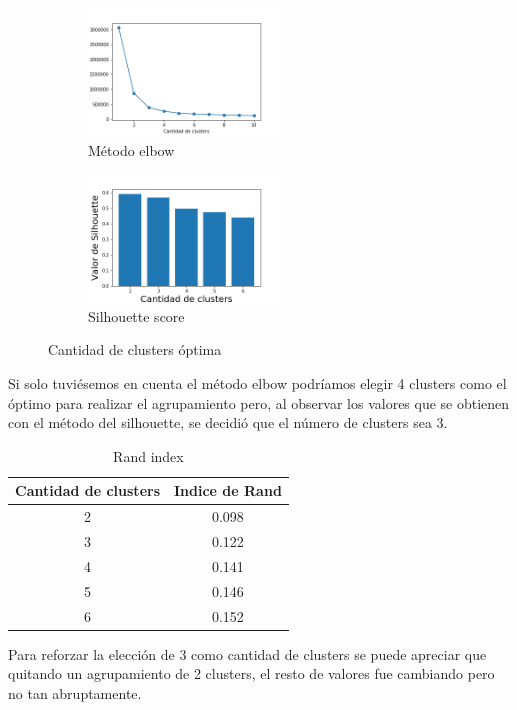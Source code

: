 \begin{figure}[H]
    \begin{subfigure}{.4\textwidth}
        \centering
        \includegraphics[width = 2in]{img/kmeans/elbow.png}
        \caption{Método elbow}
    \end{subfigure}
    \begin{subfigure}{.4\textwidth}
        \centering
        \includegraphics[width = 2in]{img/kmeans/silhouette-features.png}
        \caption{Silhouette score}
    \end{subfigure}
    \caption{Cantidad de clusters óptima}
    \label{fig:elbow-silhouette}
\end{figure}

Si solo tuviésemos en cuenta el método elbow podríamos elegir 4 clusters como el óptimo para realizar el agrupamiento pero, al observar los valores que se obtienen con el método del silhouette, se decidió que el número de clusters sea 3.

\begin{table}[H]
    \centering
    \begin{tabular}{|c|c|}
        \hline
        Cantidad de clusters & Indice de Rand \\
        \hline
        2 & 0.098 \\
        3 & 0.122 \\
        4 & 0.141 \\
        5 & 0.146 \\
        6 & 0.152 \\
        \hline
    \end{tabular}
    \caption{Rand index}
    \label{tab:rand-kmeans-af}
\end{table}

Para reforzar la elección de 3 como cantidad de clusters se puede apreciar que quitando un agrupamiento de 2 clusters, el resto de valores fue cambiando pero no tan abruptamente.

